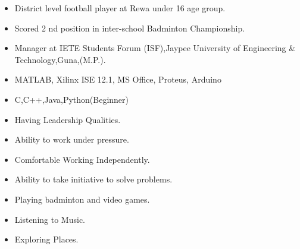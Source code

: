 \documentclass[10pt,a4paper,ragged2e]{altacv}
\begin{document}

\smallskip
\begin{itemize}
\item District level football player at Rewa under 16 age group.
\smallskip
\item Scored 2 nd position in inter-school Badminton Championship.
\smallskip
\item Manager at IETE Students Forum (ISF),Jaypee University of Engineering \& Technology,Guna,(M.P.).
\end{itemize}

\smallskip
\begin{itemize}
\item MATLAB, Xilinx ISE 12.1, MS Office, Proteus, Arduino
\smallskip
\item C,C++,Java,Python(Beginner)
\smallskip
\end{itemize}

\smallskip
\begin{itemize}
\item Having Leadership Qualities.
\smallskip
\item Ability to work under pressure.
\smallskip
\item Comfortable Working Independently.
\smallskip
\item Ability to take initiative to solve problems.
\end{itemize}

\smallskip
\begin{itemize}
\item Playing badminton and video games.
\smallskip
\item Listening to Music.
\smallskip
\item Exploring Places.
\end{itemize}




\end{document}
